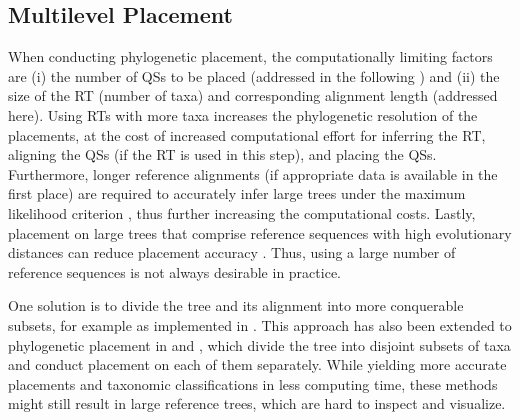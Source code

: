 \subsection{Multilevel Placement}
\label{ch:AutomaticTrees:sec:Methods:sub:MultilevelPlacement}


When conducting phylogenetic placement, the computationally limiting factors are
(i) the number of \acp{QS} to be placed (addressed in the following )
and (ii) the size of the \ac{RT} (number of taxa) and corresponding alignment length (addressed here).
Using \acp{RT} with more taxa increases the phylogenetic resolution of the placements,
at the cost of increased computational effort for inferring the \ac{RT},
aligning the \acp{QS} (if the \ac{RT} is used in this step), and placing the \acp{QS}.
Furthermore, longer reference alignments (if appropriate data is available in the first place)
are required to accurately infer large trees under the maximum likelihood criterion \cite{Yang1994},
thus further increasing the computational costs.
Lastly, placement on large trees that comprise reference sequences with high evolutionary distances
can reduce placement accuracy \cite{Mirarab2012}.
Thus, using a large number of reference sequences is not always desirable in practice.

One solution is to divide the tree and its alignment into more conquerable subsets, %
for example as implemented in  \cite{Liu2009,Liu2012}.
This approach has also been extended to phylogenetic placement
in  \cite{Mirarab2012} and  \cite{Nguyen2014},
which divide the tree into disjoint subsets of taxa and conduct placement on each of them separately.
While yielding more accurate placements and taxonomic classifications in less computing time,
these methods might still result in large reference trees, which are hard to inspect and visualize.

